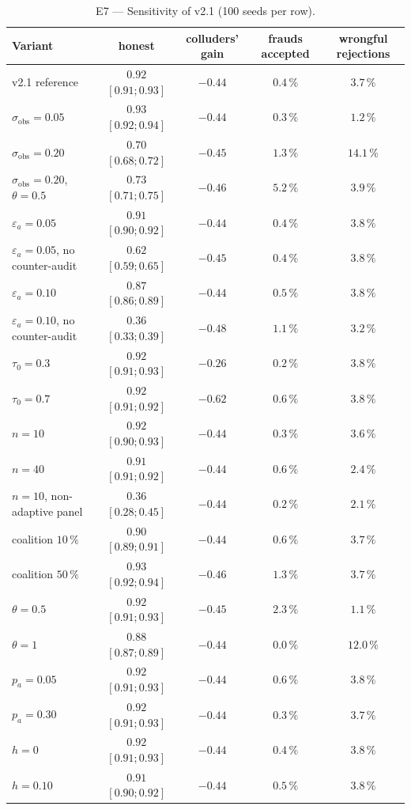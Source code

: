 \documentclass[11pt,a4paper]{article}
\theoremstyle{plain}
\theoremstyle{definition}
\theoremstyle{remark}
\newcommand{\1}{\mathbf{1}}
\begin{document}
\begin{table}[h]
\centering
\caption{E7 --- Sensitivity of v2.1 (100 seeds per row).}
\label{tab:E7}
\small
\begin{tabular}{lcccc}
\toprule
Variant & honest & colluders' gain & frauds accepted & wrongful rejections \\
\midrule
v2.1 reference & $0.92$ $[0.91;0.93]$ & $-0.44$ & $0.4\,\%$ & $3.7\,\%$ \\
$\sigma_{\text{obs}}=0.05$ & $0.93$ $[0.92;0.94]$ & $-0.44$ & $0.3\,\%$ & $1.2\,\%$ \\
$\sigma_{\text{obs}}=0.20$ & $0.70$ $[0.68;0.72]$ & $-0.45$ & $1.3\,\%$ & $14.1\,\%$ \\
$\sigma_{\text{obs}}=0.20$, $\theta=0.5$ & $0.73$ $[0.71;0.75]$ & $-0.46$ & $5.2\,\%$ & $3.9\,\%$ \\
$\varepsilon_a=0.05$ & $0.91$ $[0.90;0.92]$ & $-0.44$ & $0.4\,\%$ & $3.8\,\%$ \\
$\varepsilon_a=0.05$, no counter-audit & $0.62$ $[0.59;0.65]$ & $-0.45$ & $0.4\,\%$ & $3.8\,\%$ \\
$\varepsilon_a=0.10$ & $0.87$ $[0.86;0.89]$ & $-0.44$ & $0.5\,\%$ & $3.8\,\%$ \\
$\varepsilon_a=0.10$, no counter-audit & $0.36$ $[0.33;0.39]$ & $-0.48$ & $1.1\,\%$ & $3.2\,\%$ \\
$\tau_0=0.3$ & $0.92$ $[0.91;0.93]$ & $-0.26$ & $0.2\,\%$ & $3.8\,\%$ \\
$\tau_0=0.7$ & $0.92$ $[0.91;0.92]$ & $-0.62$ & $0.6\,\%$ & $3.8\,\%$ \\
$n=10$ & $0.92$ $[0.90;0.93]$ & $-0.44$ & $0.3\,\%$ & $3.6\,\%$ \\
$n=40$ & $0.91$ $[0.91;0.92]$ & $-0.44$ & $0.6\,\%$ & $2.4\,\%$ \\
$n=10$, non-adaptive panel & $0.36$ $[0.28;0.45]$ & $-0.44$ & $0.2\,\%$ & $2.1\,\%$ \\
coalition $10\,\%$ & $0.90$ $[0.89;0.91]$ & $-0.44$ & $0.6\,\%$ & $3.7\,\%$ \\
coalition $50\,\%$ & $0.93$ $[0.92;0.94]$ & $-0.46$ & $1.3\,\%$ & $3.7\,\%$ \\
$\theta=0.5$ & $0.92$ $[0.91;0.93]$ & $-0.45$ & $2.3\,\%$ & $1.1\,\%$ \\
$\theta=1$ & $0.88$ $[0.87;0.89]$ & $-0.44$ & $0.0\,\%$ & $12.0\,\%$ \\
$p_a=0.05$ & $0.92$ $[0.91;0.93]$ & $-0.44$ & $0.6\,\%$ & $3.8\,\%$ \\
$p_a=0.30$ & $0.92$ $[0.91;0.93]$ & $-0.44$ & $0.3\,\%$ & $3.7\,\%$ \\
$h=0$ & $0.92$ $[0.91;0.93]$ & $-0.44$ & $0.4\,\%$ & $3.8\,\%$ \\
$h=0.10$ & $0.91$ $[0.90;0.92]$ & $-0.44$ & $0.5\,\%$ & $3.8\,\%$ \\
\bottomrule
\end{tabular}
\end{table}
\end{document}
